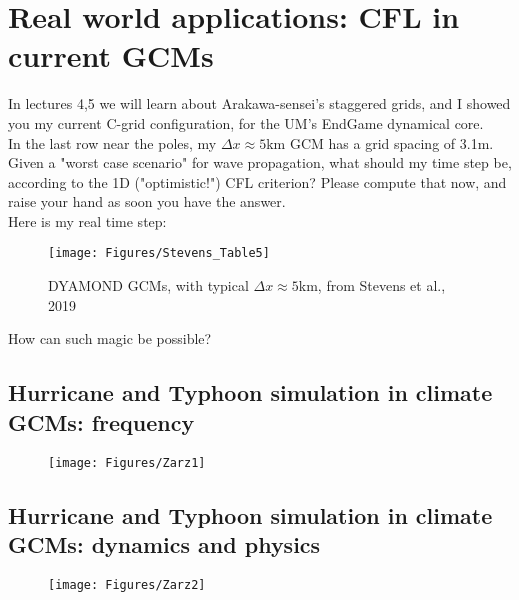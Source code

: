\section{Real world applications: CFL in current GCMs}

In lectures 4,5 we will learn about Arakawa-sensei's staggered grids, and I showed you my current C-grid configuration, for the UM's EndGame dynamical core. \\

In the last row near the poles, my $\Delta x \approx 5$km GCM has a grid spacing of 3.1m. Given a "worst case scenario" for wave propagation, what should my time step be, according to the 1D ("optimistic!") CFL criterion? Please compute that now, and raise your hand as soon you have the answer.\\

Here is my real time step: 

\begin{figure}[h!]
	\texttt{[image: Figures/Stevens\_Table5]}
	\caption{DYAMOND GCMs, with typical $\Delta x \approx 5$km, from Stevens et al., 2019}
\end{figure}

How can such magic be possible?

\subsection{Hurricane and Typhoon simulation in climate GCMs: frequency}

\begin{figure}[h!]
\begin{center}	
	\texttt{[image: Figures/Zarz1]}
\end{center}
\end{figure}


\subsection{Hurricane and Typhoon simulation in climate GCMs: dynamics and physics}

\begin{figure}[h!]
\begin{center}	
	\texttt{[image: Figures/Zarz2]}
\end{center}
\end{figure}

